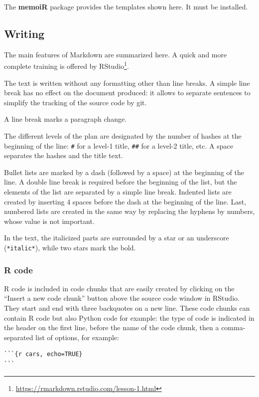 \documentclass[
  12pt,
  american,
  a4paper,
  extrafontsizes,onecolumn,openright
  ]{memoir}
\begin{document}
The \textbf{memoiR} package provides the templates shown here.
It must be installed.

\subsection{Writing}\label{writing}

The main features of Markdown are summarized here.
A quick and more complete training is offered by RStudio\footnote{\url{https://rmarkdown.rstudio.com/lesson-1.html}}.

The text is written without any formatting other than line breaks.
A simple line break has no effect on the document produced: it allows to separate sentences to simplify the tracking of the source code by git.

A line break marks a paragraph change.

The different levels of the plan are designated by the number of hashes at the beginning of the line: \texttt{\#} for a level-1 title, \texttt{\#\#} for a level-2 title, etc.
A space separates the hashes and the title text.

Bullet lists are marked by a dash (followed by a space) at the beginning of the line.
A double line break is required before the beginning of the list, but the elements of the list are separated by a simple line break.
Indented lists are created by inserting 4 spaces before the dash at the beginning of the line.
Last, numbered lists are created in the same way by replacing the hyphens by numbers, whose value is not important.

In the text, the italicized parts are surrounded by a star or an underscore (\texttt{*italic*}), while two stars mark the bold.

\subsubsection{R code}\label{r-code}

R code is included in code chunks that are easily created by clicking on the \enquote{Insert a new code chunk} button above the source code window in RStudio.
They start and end with three backquotes on a new line.
These code chunks can contain R code but also Python code for example: the type of code is indicated in the header on the first line, before the name of the code chunk, then a comma-separated list of options, for example:

\begin{verbatim}
```{r cars, echo=TRUE}
```
\end{verbatim}
\end{document}
